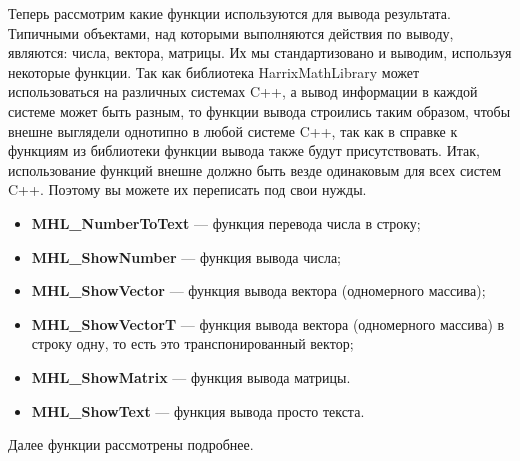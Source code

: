 Теперь рассмотрим какие функции используются для вывода результата. Типичными объектами, над которыми выполняются действия по выводу, являются: числа, вектора, матрицы. Их мы стандартизовано и выводим, используя некоторые функции. Так как библиотека HarrixMathLibrary может использоваться на различных системах C++, а вывод информации в каждой системе может быть разным, то функции вывода строились таким образом, чтобы внешне выглядели однотипно в любой системе C++, так как в справке к функциям из библиотеки функции вывода также будут присутствовать. Итак, использование функций внешне должно быть везде одинаковым для всех систем C++.  Поэтому вы можете их переписать под свои нужды.


\begin{itemize}
\item \textbf{MHL\_NumberToText} --- функция перевода числа в строку; 
\item \textbf{MHL\_ShowNumber} --- функция вывода числа;
\item \textbf{MHL\_ShowVector} --- функция вывода вектора (одномерного массива);
\item \textbf{MHL\_ShowVectorT} --- функция вывода вектора (одномерного массива) в строку одну, то есть это транспонированный вектор;
\item \textbf{MHL\_ShowMatrix} --- функция вывода матрицы.
\item \textbf{MHL\_ShowText} --- функция вывода просто текста.
\end{itemize}

Далее функции рассмотрены подробнее.

